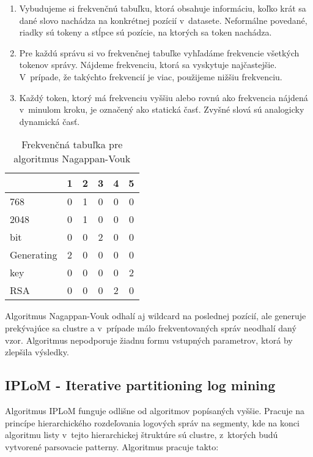 \begin{enumerate}
  \item Vybudujeme si frekvenčnú tabuľku, ktorá obsahuje informáciu, koľko krát sa dané slovo nachádza na konkrétnej pozícií v~datasete. Neformálne povedané, riadky sú tokeny a stĺpce sú pozície, na ktorých sa token nachádza.
  \item Pre každú správu si vo frekvenčnej tabuľke vyhľadáme frekvencie všetkých tokenov správy. Nájdeme frekvenciu, ktorá sa vyskytuje najčastejšie. V~prípade, že takýchto frekvencií je viac, použijeme nižšiu frekvenciu.
  \item Každý token, ktorý má frekvenciu vyššiu alebo rovnú ako frekvencia nájdená v~minulom kroku, je označený ako statická časť. Zvyšné slová sú analogicky dynamická časť.
\end{enumerate}

\begin{table}[htbp]
\centering
\begin{tabularx}{175px}{ | X | c | c | c | c | c | }
\hline
           & 1 & 2 & 3 & 4 & 5 \\ \hline
768        & 0 & 1 & 0 & 0 & 0 \\ \hline
2048       & 0 & 1 & 0 & 0 & 0 \\ \hline
bit        & 0 & 0 & 2 & 0 & 0 \\ \hline
Generating & 2 & 0 & 0 & 0 & 0 \\ \hline
key        & 0 & 0 & 0 & 0 & 2 \\ \hline
RSA        & 0 & 0 & 0 & 2 & 0 \\ \hline
\end{tabularx}
\caption{Frekvenčná tabuľka pre algoritmus Nagappan-Vouk}
\label{fig:naggapan}
\end{table}

Algoritmus Nagappan-Vouk odhalí aj wildcard na poslednej pozícií, ale generuje prekývajúce sa clustre a v~prípade málo frekventovaných správ neodhalí daný vzor. Algoritmus nepodporuje žiadnu formu vstupných parametrov, ktorá by zlepšila výsledky.

\subsection{IPLoM - Iterative partitioning log mining}
Algoritmus IPLoM \parencite{iplom}  funguje odlišne od algoritmov popísaných vyššie. Pracuje na princípe hierarchického rozdeľovania logových správ na segmenty, kde na konci algoritmu listy v~tejto hierarchickej štruktúre sú clustre, z~ktorých budú vytvorené parsovacie patterny. Algoritmus pracuje takto:

